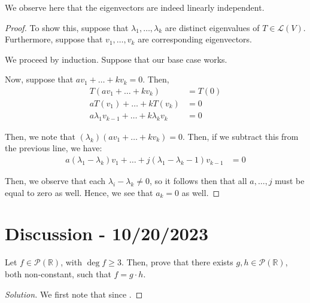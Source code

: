 \documentclass[openany]{book}
\newenvironment{solution}{\begin{proof}[Solution]}{\end{proof}}
\newcommand{\RR}{\mathbb{R}}
\begin{document}
We observe here that the eigenvectors are indeed linearly independent.

\begin{proof}
	To show this, suppose that $\lambda_{1}, \ldots, \lambda_k$ are distinct eigenvalues of $T \in \mathcal L(V)$. Furthermore, suppose that $v_{1}, \ldots, v_{k}$ are corresponding eigenvectors. 

We proceed by induction. Suppose that our base case works.

Now, suppose that $av_{1} + \ldots + kv_{k} = 0$. Then,
\begin{align*}
	T(av_{1} + \ldots + kv_{k}) &= T(0) \\
	aT(v_{1}) + \ldots + kT(v_{k}) &= 0 \\
	a\lambda_1 v_{k-1} + \ldots + k\lambda_k v_{k} &= 0
\end{align*}

Then, we note that $(\lambda_k)(av_{1} + \ldots + kv_{k}) = 0$. Then, if we subtract this from the previous line, we have:
\begin{align*}
	a(\lambda_{1} - \lambda_{k})v_{1} + \ldots + j(\lambda_1 - \lambda_k-1)v_{k-1} &= 0
\end{align*}

Then, we observe that each $\lambda_i - \lambda_k \neq 0$, so it follows then that all $a, \ldots, j$ must be equal to zero as well. Hence, we see that $a_{k} = 0$ as well.
\end{proof}

\section{Discussion - 10/20/2023}
\begin{hw}
	Let $f \in \mathscr{P}(\RR)$, with $\deg f \geq 3$. Then, prove that there exists $g, h \in \mathscr P(\RR)$, both non-constant, such that $f = g \cdot h$.
\end{hw}
\begin{solution}
	 We first note that since $.$
\end{solution}
\end{document}
